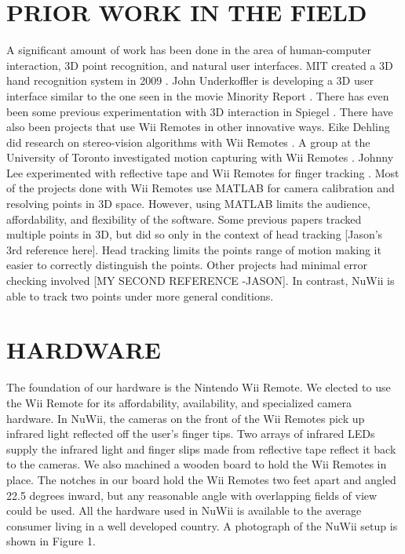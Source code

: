 \documentclass[a4paper,twoside]{article}
\begin{document}
\section{\uppercase{Prior Work in the Field}} \noindent  A significant amount
of work has been done in the area of human-computer interaction, 3D point
recognition, and natural user interfaces. MIT created a 3D hand recognition
system in 2009 \cite{Wang09}. John Underkoffler is developing a 3D user
interface similar to the one seen in the movie Minority Report
\cite{Underkoffler10}. There has even been some previous experimentation with
3D interaction in Spiegel \cite{Bak04}. There have also been projects that use
Wii Remotes in other innovative ways. Eike Dehling did research on
stereo-vision algorithms with Wii Remotes \cite{Dehling08}. A group at the
University of Toronto investigated motion capturing with Wii Remotes
\cite{Wang08}. Johnny Lee experimented with reflective tape and Wii Remotes for
finger tracking  \cite{Lee08}. Most of the projects done with Wii Remotes use
MATLAB for camera calibration and resolving points in 3D space. However, using
MATLAB limits the audience, affordability, and flexibility of the software.
Some previous papers tracked multiple points in 3D, but did so only in the
context of head tracking [Jason's 3rd reference here]. Head tracking limits the
points range of motion making it easier to correctly distinguish the points.
Other projects had minimal error checking involved [MY SECOND REFERENCE
-JASON]. In contrast, NuWii is able to track two points under more general
conditions.
 
\section{\uppercase{Hardware}} \noindent The foundation of our hardware is the
Nintendo Wii Remote. We elected to use the Wii Remote for its affordability,
availability, and specialized camera hardware. In NuWii, the cameras on the
front of the Wii Remotes pick up infrared light reflected off the user's finger
tips. Two arrays of infrared LEDs supply the infrared light and finger slips
made from reflective tape reflect it back to the cameras.  We also machined a
wooden board to hold the Wii Remotes in place. The notches in our board hold
the Wii Remotes two feet apart and angled 22.5 degrees inward, but any
reasonable angle with overlapping fields of view could be used. All the
hardware used in NuWii is available to the average consumer living in a well
developed country. A photograph of the NuWii setup is shown in Figure 1.
 
\end{document}
